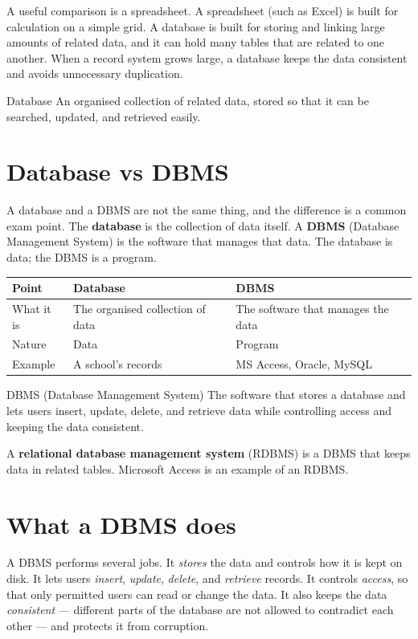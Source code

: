 A useful comparison is a spreadsheet. A spreadsheet (such as Excel) is built
for calculation on a simple grid. A database is built for storing and linking
large amounts of related data, and it can hold many tables that are related
to one another. When a record system grows large, a database keeps the data
consistent and avoids unnecessary duplication.

\begin{definitionbox}{Database}
An organised collection of related data, stored so that it can be searched,
updated, and retrieved easily.
\end{definitionbox}

\section{Database vs DBMS}
A database and a DBMS are not the same thing, and the difference is a common
exam point. The \textbf{database} is the collection of data itself. A
\textbf{DBMS} (Database Management System) is the software that manages that
data. The database is data; the DBMS is a program.

\begin{center}
\begin{tabular}{p{}p{}p{}}
\toprule
\textbf{Point} & \textbf{Database} & \textbf{DBMS} \\
\midrule
What it is & The organised collection of data & The software that manages the data \\
Nature & Data & Program \\
Example & A school's records & MS Access, Oracle, MySQL \\
\bottomrule
\end{tabular}
\end{center}

\begin{definitionbox}{DBMS (Database Management System)}
The software that stores a database and lets users insert, update, delete,
and retrieve data while controlling access and keeping the data consistent.
\end{definitionbox}

A \textbf{relational database management system} (RDBMS) is a DBMS that keeps
data in related tables. Microsoft Access is an example of an RDBMS.

\section{What a DBMS does}
A DBMS performs several jobs. It \emph{stores} the data and controls how it is
kept on disk. It lets users \emph{insert}, \emph{update}, \emph{delete}, and
\emph{retrieve} records. It controls \emph{access}, so that only permitted
users can read or change the data. It also keeps the data
\emph{consistent} --- different parts of the database are not allowed to
contradict each other --- and protects it from corruption.

